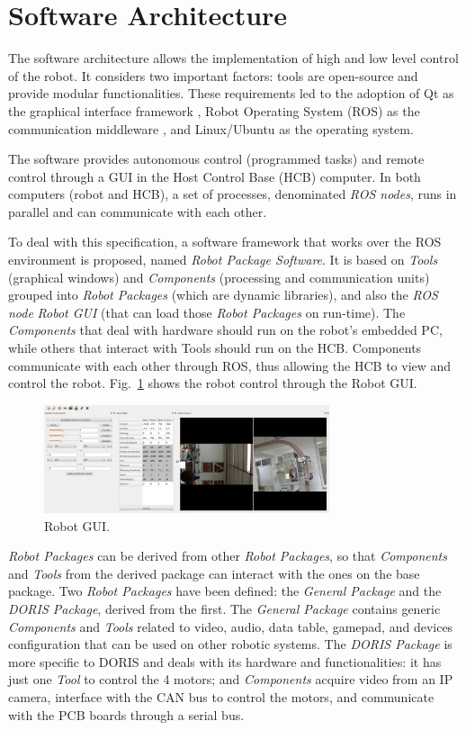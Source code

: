 \documentclass{ifacconf}
\begin{document}
\section{Software Architecture}\label{sec:software}
The software architecture allows the implementation of high and low level
control of the robot. It considers two important factors: tools are open-source
and provide modular functionalities. These requirements led to the adoption of
Qt as the graphical interface framework \citep{qt}, Robot Operating System
(ROS) as the communication middleware \citep{ros}, and Linux/Ubuntu as the
operating system.

The software provides autonomous control (programmed tasks) and remote control
through a GUI in the Host Control Base (HCB) computer. In both computers (robot
and HCB), a set of processes, denominated \emph{ROS nodes}, runs in parallel and
can communicate with each other.

To deal with this specification, a software framework that works over the ROS
environment is proposed, named \emph{Robot Package Software}. It is based on
\emph{Tools} (graphical windows) and \emph{Components} (processing and
communication units) grouped into \emph{Robot Packages} (which are dynamic
libraries), and also the \emph{ROS node} \emph{Robot GUI} (that can load those
\emph{Robot Packages} on run-time). The \emph{Components} that deal with
hardware should run on the robot's embedded PC, while others that interact with
Tools should run on the HCB. Components communicate with each other through
ROS, thus allowing the HCB to view and control the robot.
Fig.~\ref{fig:robotgui} shows the robot control through the Robot GUI.

\begin{figure} 
\centering
\includegraphics[width=8.4cm]{figs/robotgui2.jpg}
\caption{Robot GUI.}
\label{fig:robotgui}
\end{figure}

\emph{Robot Packages} can be derived from other \emph{Robot Packages}, so that
\emph{Components} and \emph{Tools} from the derived package can interact with
the ones on the base package. Two \emph{Robot Packages} have been defined: the
\emph{General Package} and the \emph{DORIS Package}, derived from the first. The
\emph{General Package} contains generic \emph{Components} and \emph{Tools}
related to video, audio, data table, gamepad, and devices configuration that can
be used on other robotic systems. The \emph{DORIS Package} is more specific to
DORIS and deals with its hardware and functionalities: it has just one
\emph{Tool} to control the 4 motors; and \emph{Components} acquire video from
an IP camera, interface with the CAN bus to control the motors, and communicate
with the PCB boards through a serial bus.
\end{document}
